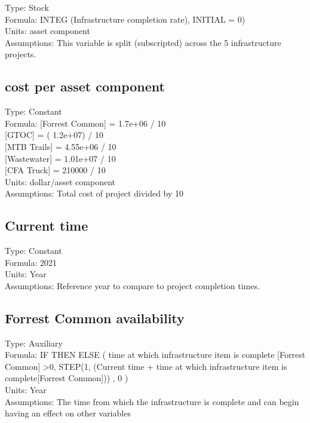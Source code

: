 \documentclass[
  11pt,
]{book}
\begin{document}
Type: Stock\\
Formula: INTEG (Infrastructure completion rate), INITIAL = 0)\\
Units: asset component\\
Assumptions: This variable is split (subscripted) across the 5 infrastructure projects.

\hypertarget{cost-per-asset-component}{%
\subsection{cost per asset component}\label{cost-per-asset-component}}

Type: Constant\\
Formula: {[}Forrest Common{]} = 1.7e+06 / 10\\
{[}GTOC{]} = ( 1.2e+07) / 10\\
{[}MTB Trails{]} = 4.55e+06 / 10\\
{[}Wastewater{]} = 1.01e+07 / 10\\
{[}CFA Truck{]} = 210000 / 10\\
Units: dollar/asset component\\
Assumptions: Total cost of project divided by 10

\hypertarget{current-time-1}{%
\subsection{Current time}\label{current-time-1}}

Type: Constant\\
Formula: 2021\\
Units: Year\\
Assumptions: Reference year to compare to project completion times.

\hypertarget{forrest-common-availability}{%
\subsection{Forrest Common availability}\label{forrest-common-availability}}

Type: Auxiliary\\
Formula: IF THEN ELSE ( time at which infrastructure item is complete {[}Forrest Common{]} \textgreater0, STEP(1, (Current time + time at which infrastructure item is complete{[}Forrest Common{]})) , 0 )\\
Units: Year\\
Assumptions: The time from which the infrastructure is complete and can begin having an effect on other variables
\end{document}
